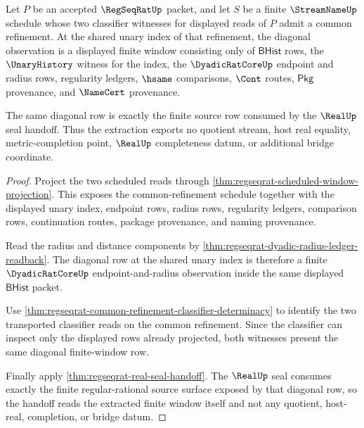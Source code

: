 \begin{theorem}
\label{thm:regseqrat-diagonal-window-extraction}
Let $P$ be an accepted $\RegSeqRatUp$ packet, and let $S$ be a finite $\StreamNameUp$ schedule whose two classifier witnesses for displayed reads of $P$ admit a common refinement. At the shared unary index of that refinement, the diagonal observation is a displayed finite window consisting only of $\mathsf{BHist}$ rows, the $\UnaryHistory$ witness for the index, the $\DyadicRatCoreUp$ endpoint and radius rows, regularity ledgers, $\hsame$ comparisons, $\Cont$ routes, $\mathsf{Pkg}$ provenance, and $\NameCert$ provenance.

The same diagonal row is exactly the finite source row consumed by the $\RealUp$ seal handoff. Thus the extraction exports no quotient stream, host real equality, metric-completion point, $\RealUp$ completeness datum, or additional bridge coordinate.
\end{theorem}
\begin{proof}
Project the two scheduled reads through \autoref{thm:regseqrat-scheduled-window-projection}. This exposes the common-refinement schedule together with the displayed unary index, endpoint rows, radius rows, regularity ledgers, comparison rows, continuation routes, package provenance, and naming provenance.

Read the radius and distance components by \autoref{thm:regseqrat-dyadic-radius-ledger-readback}. The diagonal row at the shared unary index is therefore a finite $\DyadicRatCoreUp$ endpoint-and-radius observation inside the same displayed $\mathsf{BHist}$ packet.

Use \autoref{thm:regseqrat-common-refinement-classifier-determinacy} to identify the two transported classifier reads on the common refinement. Since the classifier can inspect only the displayed rows already projected, both witnesses present the same diagonal finite-window row.

Finally apply \autoref{thm:regseqrat-real-seal-handoff}. The $\RealUp$ seal consumes exactly the finite regular-rational source surface exposed by that diagonal row, so the handoff reads the extracted finite window itself and not any quotient, host-real, completion, or bridge datum.
\end{proof}

